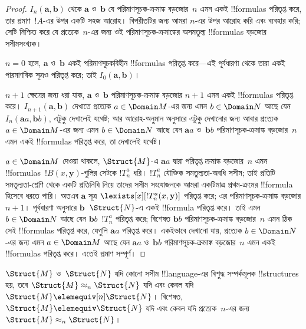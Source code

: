 \documentclass[../../../include/open-logic-section]{subfiles}
\begin{document}
\begin{proof}
  $I_n(\mathbf{a},\mathbf{b})$ থেকে $\mathbf{a}$ ও~$\mathbf{b}$ যে
  পরিমাণসূচক-ক্রমাঙ্ক বড়জোর~$n$ এমন একই !!{formula}s পরিতৃপ্ত করে, তার
  প্রমাণ~$!A$-এর উপর একটি সহজ আরোহ। বিপরীতটির জন্য আমরা $n$-এর উপর
  আরোহ করি এবং  ব্যবহার করি; সেটি নিশ্চিত করে যে
  প্রত্যেক~$n$-এর জন্য ওই পরিমাণসূচক-ক্রমাঙ্কের অসমতুল্য !!{formula}s
  বড়জোর সসীমসংখ্যক।

  $n=0$ হলে, $\mathbf{a}$ ও~$\mathbf{b}$ একই পরিমাণসূচকবিহীন
  !!{formula}s পরিতৃপ্ত করে---এই পূর্বধারণা থেকে তারা একই পারমাণবিক
  সূত্রও পরিতৃপ্ত করে; তাই $I_0(\mathbf{a},\mathbf{b})$।

  $n+1$ ক্ষেত্রের জন্য ধরা যাক, $\mathbf{a}$ ও~$\mathbf{b}$
  পরিমাণসূচক-ক্রমাঙ্ক বড়জোর $n+1$ এমন একই !!{formula}s পরিতৃপ্ত করে।
  $I_{n+1}(\mathbf{a},\mathbf{b})$ দেখাতে প্রত্যেক $a \in \Domain M$-এর
  জন্য এমন $b \in \Domain N$ আছে যেন $I_n(\mathbf{a}a,\mathbf{b}b)$,
  এটুকু দেখালেই যথেষ্ট; আর আরোহ-অনুমান অনুসারে এটুকু দেখানোর জন্য আবার
  প্রত্যেক $a \in \Domain M$-এর জন্য এমন $b \in \Domain N$ আছে যেন
  $\mathbf{a}a$ ও~$\mathbf{b}b$ পরিমাণসূচক-ক্রমাঙ্ক বড়জোর~$n$ এমন একই
  !!{formula}s পরিতৃপ্ত করে, তা দেখালেই যথেষ্ট।

  $a \in \Domain M$ দেওয়া থাকলে, $\Struct{M}$-এ $\mathbf{a}a$ দ্বারা
  পরিতৃপ্ত ক্রমাঙ্ক বড়জোর~$n$ এমন !!{formula}s~$!B(x,\mathbf{y})$-গুলির
  সেটকে $!T^a_n$ ধরি। $!T^a_n$ যৌক্তিক সমতুল্যতা-অবধি সসীম; তাই প্রতিটি
  সমতুল্যতা-শ্রেণি থেকে একটি প্রতিনিধি নিয়ে তাদের সসীম সংযোজনকে আমরা
  একটিমাত্র প্রথম-ক্রমের !!{formula} হিসেবে ধরতে পারি।
  অতএব $\mathbf{a}$ সূত্র $\lexists[x][!T^a_n(x,\mathbf{y})]$
  পরিতৃপ্ত করে; এর পরিমাণসূচক-ক্রমাঙ্ক বড়জোর $n+1$। পূর্বধারণা অনুসারে
  $\mathbf{b}$~$\Struct{N}$-এ একই !!{formula} পরিতৃপ্ত করে। তাই এমন
  $b \in \Domain N$ আছে যেন $\mathbf{b}b$~$!T^a_n$ পরিতৃপ্ত করে;
  বিশেষত $\mathbf{b}b$ পরিমাণসূচক-ক্রমাঙ্ক বড়জোর~$n$ এমন ঠিক সেই
  !!{formula}s পরিতৃপ্ত করে, যেগুলি $\mathbf{a}a$ পরিতৃপ্ত করে। একইভাবে
  দেখানো যায়, প্রত্যেক $b \in \Domain N$-এর জন্য এমন $a\in \Domain M$
  আছে যেন $\mathbf{a}a$ ও~$\mathbf{b}b$ পরিমাণসূচক-ক্রমাঙ্ক বড়জোর~$n$
  এমন একই !!{formula}s পরিতৃপ্ত করে। এতেই প্রমাণ সম্পূর্ণ।
\end{proof}

\begin{cor}
  $\Struct{M}$ ও~$\Struct{N}$ যদি কোনো সসীম !!{language}-এর বিশুদ্ধ
  সম্পর্কমূলক !!{structure}s হয়, তবে $\Struct{M} \approx_n\Struct{N}$
  যদি এবং কেবল যদি $\Struct{M} \elemequiv[n] \Struct{N}$। বিশেষত,
  $\Struct{M} \elemequiv \Struct{N}$ যদি এবং কেবল যদি প্রত্যেক~$n$-এর
  জন্য $\Struct{M} \approx_n \Struct{N}$।
\end{cor}
\end{document}

